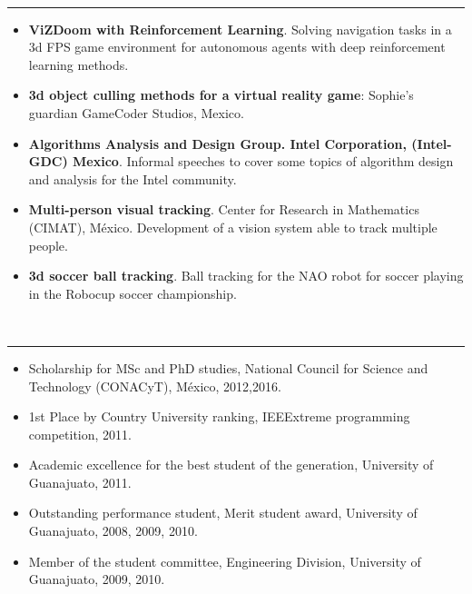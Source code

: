 \documentclass[10 pt]{article}
\newcommand{\mypartitle}[2][2.]{\vspace*{-#1 ex}~\\{\noindent {\bf #2}}}
\begin{document}
\mypartitle{Projects}
\medskip
\hrule height 0.05cm

\begin{itemize}[noitemsep]


\item \textbf{ViZDoom with Reinforcement Learning}. Solving navigation tasks in a 3d FPS game 
environment for autonomous agents with deep reinforcement learning methods.

\item \textbf{3d object culling methods for a virtual reality game}: Sophie's guardian GameCoder Studios, Mexico.

\item \textbf{Algorithms Analysis and Design Group. Intel Corporation, (Intel-GDC) Mexico}. 
Informal speeches to cover some topics of algorithm design and analysis for the Intel community.


\item \textbf{Multi-person visual tracking}. Center for Research in Mathematics (CIMAT), México. 
Development of a vision system able to track multiple people.

\item \textbf{3d soccer ball tracking}. Ball tracking for the NAO robot for soccer playing in the Robocup soccer championship.


\end{itemize}

\mypartitle{Awards and Grants}
\medskip
\hrule height 0.05cm

\begin{itemize}[noitemsep]

\item Scholarship for MSc and PhD studies, National Council for Science and Technology (CONACyT), México, 2012,2016.
\item 1st Place by Country University ranking, IEEExtreme programming competition, 2011.
\item Academic excellence for the best student of the generation, University of Guanajuato, 2011.
\item Outstanding performance student, Merit student award, University of Guanajuato, 2008, 2009, 2010.
\item Member of the student committee, Engineering Division, University of Guanajuato, 2009, 2010.

\end{itemize}
\end{document}
